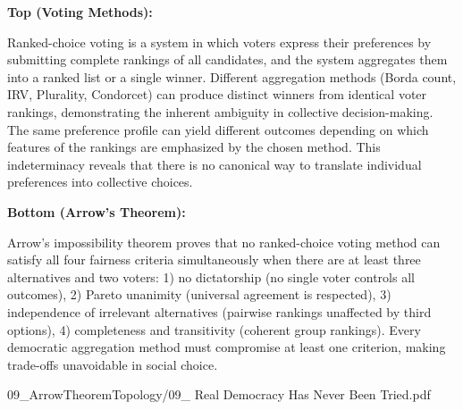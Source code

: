 \begin{SideNotePage}{
  \textbf{Top (Voting Methods):} \par Ranked-choice voting is a system in which voters express their preferences by submitting complete rankings of all candidates, and the system aggregates them into a ranked list or a single winner. Different aggregation methods (Borda count, IRV, Plurality, Condorcet) can produce distinct winners from identical voter rankings, demonstrating the inherent ambiguity in collective decision-making. The same preference profile can yield different outcomes depending on which features of the rankings are emphasized by the chosen method. This indeterminacy reveals that there is no canonical way to translate individual preferences into collective choices.


  \textbf{Bottom (Arrow's Theorem):} \par Arrow's impossibility theorem proves that no ranked-choice voting method can satisfy all four fairness criteria simultaneously when there are at least three alternatives and two voters: 1) no dictatorship (no single voter controls all outcomes), 2) Pareto unanimity (universal agreement is respected), 3) independence of irrelevant alternatives (pairwise rankings unaffected by third options), 4) completeness and transitivity (coherent group rankings). Every democratic aggregation method must compromise at least one criterion, making trade-offs unavoidable in social choice. 
}{09_ArrowTheoremTopology/09_ Real Democracy Has Never Been Tried.pdf}
\end{SideNotePage}